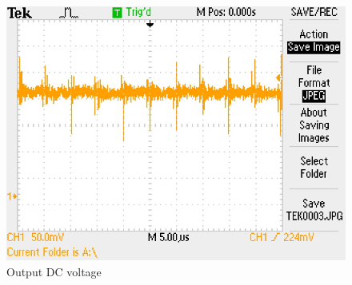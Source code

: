 \documentclass[final]{scrreprt} %
\begin{document}
\begin{figure}[h]
	\begin{center}
		\includegraphics[width=\linewidth/2]{resources/DC_out-rc.jpg}
	\end{center}
	\caption{Output DC voltage}
	\label{fig:DC_out}
\end{figure}
\end{document}
